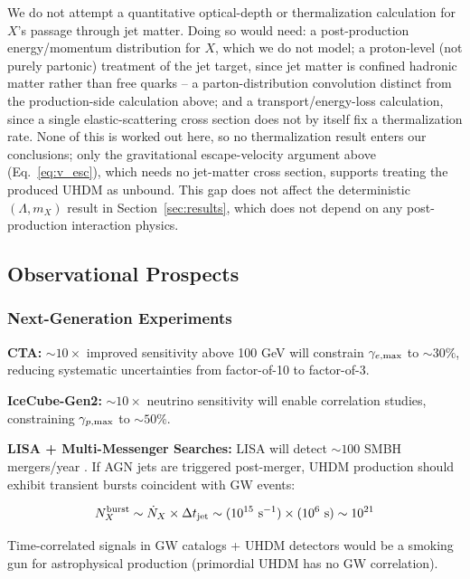 \documentclass[twocolumn,superscriptaddress,prd,nofootinbib]{revtex4-2}
\begin{document}
We do not attempt a quantitative optical-depth or thermalization calculation for $X$'s passage through jet matter. Doing so would need: a post-production energy/momentum distribution for $X$, which we do not model; a proton-level (not purely partonic) treatment of the jet target, since jet matter is confined hadronic matter rather than free quarks -- a parton-distribution convolution distinct from the production-side calculation above; and a transport/energy-loss calculation, since a single elastic-scattering cross section does not by itself fix a thermalization rate. None of this is worked out here, so no thermalization result enters our conclusions; only the gravitational escape-velocity argument above (Eq.~\ref{eq:v_esc}), which needs no jet-matter cross section, supports treating the produced UHDM as unbound. This gap does not affect the deterministic $(\Lambda,m_X)$ result in Section~\ref{sec:results}, which does not depend on any post-production interaction physics.

\subsection{Observational Prospects}

\subsubsection{Next-Generation Experiments}

\textbf{CTA:} $\sim 10\times$ improved sensitivity above 100 GeV will constrain $\gamma_{e,\rm max}$ to $\sim 30\%$, reducing systematic uncertainties from factor-of-10 to factor-of-3.

\textbf{IceCube-Gen2:} $\sim 10\times$ neutrino sensitivity will enable correlation studies, constraining $\gamma_{p,\rm max}$ to $\sim 50\%$.

\textbf{LISA + Multi-Messenger Searches:} LISA will detect $\sim 100$ SMBH mergers/year \citep{AmaroSeoane2017}. If AGN jets are triggered post-merger, UHDM production should exhibit transient bursts coincident with GW events:

\begin{equation}
N_X^{\rm burst} \sim \dot{N}_X \times \Delta t_{\rm jet} \sim (10^{15} \text{ s}^{-1}) \times (10^6 \text{ s}) \sim 10^{21}
\label{eq:N_burst}
\end{equation}

Time-correlated signals in GW catalogs + UHDM detectors would be a smoking gun for astrophysical production (primordial UHDM has no GW correlation).
\end{document}
